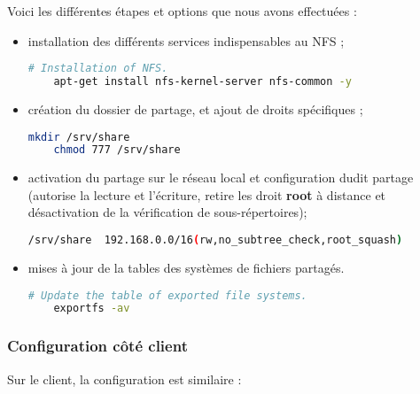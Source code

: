 Voici les différentes étapes et options que nous avons effectuées :
\begin{itemize}
\item installation des différents services indispensables au NFS ;

  \begin{lstlisting}[language=bash]
    # Installation of NFS.
    apt-get install nfs-kernel-server nfs-common -y
  \end{lstlisting}

\item création du dossier de partage, et ajout de droits
  spécifiques ;

  \begin{lstlisting}[language=bash]
    mkdir /srv/share
    chmod 777 /srv/share
  \end{lstlisting}

\item activation du partage sur le réseau local et configuration dudit
  partage (autorise la lecture et l'écriture, retire les droit \textbf{root} à
  distance et désactivation de la vérification de sous-répertoires);

  \begin{lstlisting}[language=bash]
    /srv/share  192.168.0.0/16(rw,no_subtree_check,root_squash)
  \end{lstlisting}

\item mises à jour de la tables des systèmes de fichiers partagés.

  \begin{lstlisting}[language=bash]
    # Update the table of exported file systems.
    exportfs -av
  \end{lstlisting}
\end{itemize}

\subsubsection{Configuration côté client}
\label{subsubsec:config-client}

Sur le client, la configuration est similaire :

